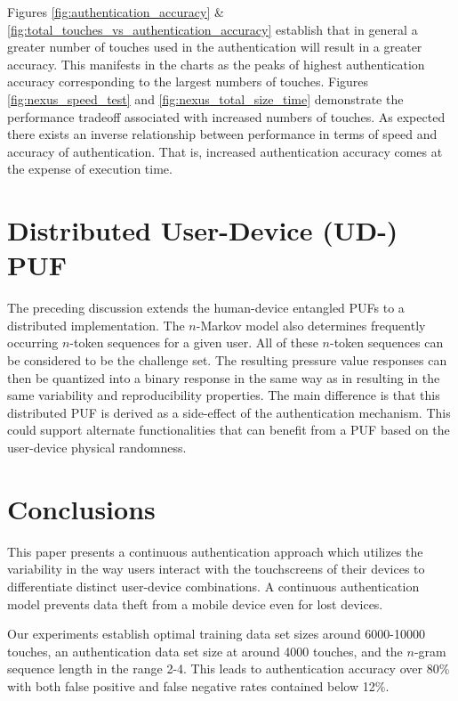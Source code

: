 \documentclass{acm_proc_article-sp}
\begin{document}
Figures \ref{fig:authentication_accuracy}  \& \ref{fig:total_touches_vs_authentication_accuracy} establish that in general a greater number of touches used in the authentication will result in a greater accuracy. This manifests in the charts as the peaks of highest authentication accuracy  
corresponding to the largest numbers of touches. Figures \ref{fig:nexus_speed_test} and \ref{fig:nexus_total_size_time} demonstrate the performance tradeoff associated with increased numbers of touches. 
As expected there exists an inverse relationship between performance in terms of speed and accuracy of authentication. That is, increased authentication accuracy comes at the expense of execution time. 

\section{Distributed User-Device (UD-) PUF}
\label{sec:PUF}
The preceding discussion extends the human-device entangled PUFs \cite{ScheelTyagi15} to a distributed
implementation. The $n$-Markov model also determines frequently occurring $n$-token sequences for a
given user. All of these $n$-token sequences can be considered to be the challenge set. The resulting
pressure value responses can then be quantized into a binary response in the same way as in 
\cite{ScheelTyagi15} resulting in the same variability and reproducibility properties. The main 
difference is that this distributed PUF is derived as a side-effect of the authentication mechanism.
This could support alternate functionalities that can benefit from a PUF based on the user-device 
physical randomness.

\section{Conclusions}
\label{sec:conclusions}
This paper presents a continuous authentication approach which utilizes the variability in the way users interact with the touchscreens of their devices to differentiate distinct user-device combinations. 
A continuous authentication model prevents data theft from a mobile device even for lost devices.

Our experiments establish optimal training data set sizes around 6000-10000 touches, an authentication
data set size at around 4000 touches, and the $n$-gram sequence length in the range 2-4. This leads to
authentication accuracy over 80\% with both false positive and false negative rates contained
below 12\%.



%



%
\end{document}
